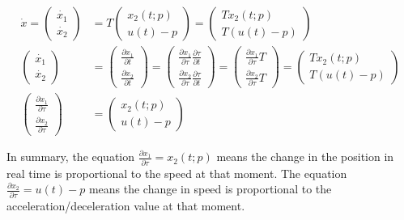 \documentclass  [
  paper    = a4,
  BCOR     = 10mm,
  twoside,
  fontsize = 12pt,
  fleqn,
  toc      = bibnumbered,
  toc      = listofnumbered,
  numbers  = noendperiod,
  headings = normal,
  listof   = leveldown,
  version  = 3.03
]                                       {scrreprt}
\newcommand{\<}{\langle}
\renewcommand{\>}{\rangle}
\begin{document}
   \begin{subequations}
   	\begin{align}
   	\dot{x} =  \begin{pmatrix} \dot{x_1} \\ \dot{x_2} \end{pmatrix}  & =  T  \begin{pmatrix}  x_2(t;p) \\ u(t)-p   \end{pmatrix} = \begin{pmatrix}  Tx_2(t;p) \\ T(u(t)-p)   \end{pmatrix} \label{eq_difT} \\ 
   	\begin{pmatrix} \dot{x_1} \\ \dot{x_2} \end{pmatrix} &= \begin{pmatrix} \frac{\partial x_1}{\partial t} \\ \frac{\partial x_2}{\partial t} \end{pmatrix} = \begin{pmatrix} \frac{\partial x_1}{\partial \tau} \frac{\partial \tau}{\partial t} \\ \frac{\partial x_2}{\partial \tau} \frac{\partial \tau}{\partial t} \end{pmatrix} =  \begin{pmatrix} \frac{\partial x_1}{\partial \tau} T \\ \frac{\partial x_2}{\partial \tau}T \end{pmatrix} =     \begin{pmatrix}  Tx_2(t;p) \\ T(u(t)-p)   \end{pmatrix} \\
   	\begin{pmatrix} \frac{\partial x_1}{\partial \tau}  \\ \frac{\partial x_2}{\partial \tau} \end{pmatrix} & =     \begin{pmatrix}  x_2(t;p) \\ u(t)-p   \end{pmatrix} \label{eq_difTau}
   	\end{align}
   \label{partialX}
   \end{subequations}
   
   In summary, the equation $\frac{\partial x_1}{\partial \tau}= x_2(t;p) $ means the change in the position in real time is proportional to the speed at that moment. The equation $\frac{\partial x_2}{\partial \tau} = u(t)-p $ means the change in speed is proportional to the acceleration/deceleration value at that moment. 
   
\end{document}
